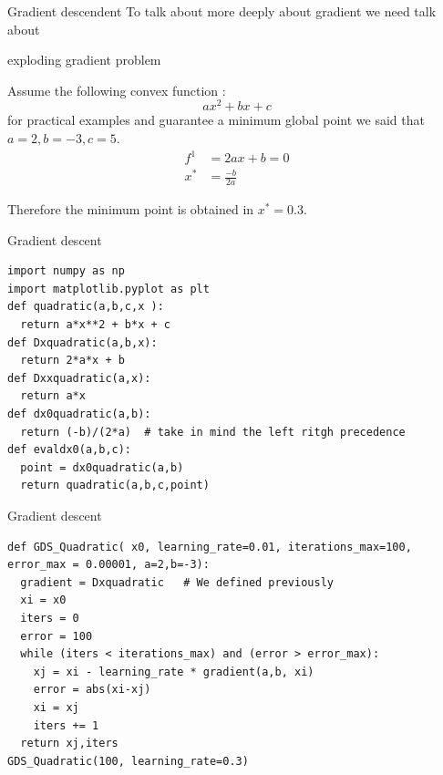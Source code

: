 \documentclass{beamer}
\begin{document}

\begin{frame}{Gradient descendent}
To talk about more deeply about gradient we need talk about 

exploding gradient problem


Assume the following convex function :
\begin{equation}
ax^{2}+ bx+c 
\end{equation}
for practical examples and guarantee a minimum global point we said that $a=2,b=-3, c=5$.
\begin{equation}
\begin{align*}
f^{1} &= 2ax + b = 0 \\
x^{*} &= \frac{-b}{2a} 
\end{align*}
\end{equation}

Therefore the minimum point is obtained in $x^{*} = 0.3$.



\end{frame}

\begin{frame}[fragile]{Gradient descent}
\begin{lstlisting}
import numpy as np
import matplotlib.pyplot as plt
def quadratic(a,b,c,x ):
  return a*x**2 + b*x + c
def Dxquadratic(a,b,x):
  return 2*a*x + b
def Dxxquadratic(a,x):
  return a*x
def dx0quadratic(a,b):
  return (-b)/(2*a)  # take in mind the left ritgh precedence 
def evaldx0(a,b,c):
  point = dx0quadratic(a,b)
  return quadratic(a,b,c,point)
\end{lstlisting}
\end{frame}






\begin{frame}[fragile]{Gradient descent}
\begin{lstlisting}
def GDS_Quadratic( x0, learning_rate=0.01, iterations_max=100, error_max = 0.00001, a=2,b=-3):
  gradient = Dxquadratic   # We defined previously
  xi = x0
  iters = 0
  error = 100
  while (iters < iterations_max) and (error > error_max):
    xj = xi - learning_rate * gradient(a,b, xi)
    error = abs(xi-xj)
    xi = xj
    iters += 1
  return xj,iters
GDS_Quadratic(100, learning_rate=0.3) 
\end{lstlisting}
\end{frame}
\end{document}
